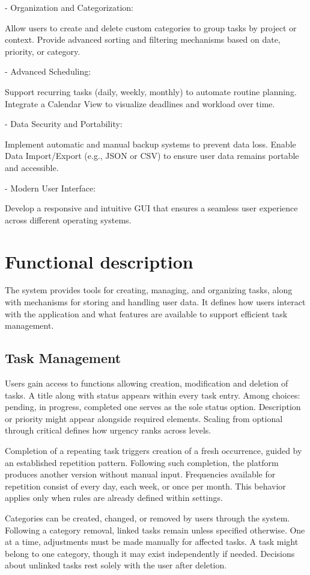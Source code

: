 \documentclass{article}
\begin{document}
- Organization and Categorization:

Allow users to create and delete custom categories to group tasks by project or context.
Provide advanced sorting and filtering mechanisms based on date, priority, or category.

- Advanced Scheduling:

Support recurring tasks (daily, weekly, monthly) to automate routine planning.
Integrate a Calendar View to visualize deadlines and workload over time.

- Data Security and Portability:

Implement automatic and manual backup systems to prevent data loss.
Enable Data Import/Export (e.g., JSON or CSV) to ensure user data remains portable and accessible.

- Modern User Interface:

Develop a responsive and intuitive GUI that ensures a seamless user experience across different operating systems.

\section{Functional description}
The system provides tools for creating, managing, and organizing tasks, along with mechanisms for storing and handling user data. It defines how users interact with the application and what features are available to support efficient task management.
\subsection{Task Management}

Users gain access to functions allowing creation, modification and deletion of tasks. A title along with status appears within every task entry. Among choices: pending, in progress, completed one serves as the sole status option. Description or priority might appear alongside required elements. Scaling from optional through critical defines how urgency ranks across levels.

Completion of a repeating task triggers creation of a fresh occurrence, guided by an established repetition pattern. Following such completion, the platform produces another version without manual input. Frequencies available for repetition consist of every day, each week, or once per month. This behavior applies only when rules are already defined within settings.

Categories can be created, changed, or removed by users through the system. Following a category removal, linked tasks remain unless specified otherwise. One at a time, adjustments must be made manually for affected tasks. A task might belong to one category, though it may exist independently if needed. Decisions about unlinked tasks rest solely with the user after deletion.
\end{document}
